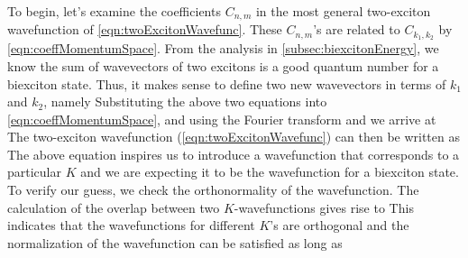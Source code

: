 To begin, let's examine the coefficients $C_{n,m}$ in the most general two-exciton wavefunction of 
 \autoref{eqn:twoExcitonWavefunc}. These $C_{n,m}$'s are related to $C_{k_1, k_2}$ by \autoref{eqn:coeffMomentumSpace}.
 From the analysis in
 \autoref{subsec:biexcitonEnergy}, we know the sum of wavevectors of two excitons is a good quantum number
for a biexciton state. Thus, it makes sense to define two new wavevectors in terms of $k_1$ and $k_2$, namely
Substituting the above two equations into \autoref{eqn:coeffMomentumSpace}, and using the Fourier transform
and 
we arrive at
The two-exciton wavefunction (\autoref{eqn:twoExcitonWavefunc}) can then be written as
The above equation inspires us to introduce a wavefunction that corresponds to a particular $K$
and we are expecting it to be the wavefunction for a biexciton state. To verify our guess, we check the orthonormality
 of  the wavefunction. The calculation of the overlap between two $K$-wavefunctions gives rise to
This indicates that the wavefunctions for different $K$'s are orthogonal and the normalization of the wavefunction
 can be satisfied as long as


